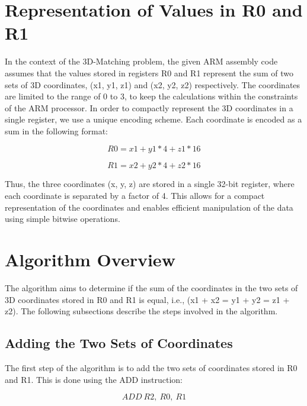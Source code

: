 


\section{Representation of Values in R0 and R1}

In the context of the 3D-Matching problem, the given ARM assembly code assumes that the values stored in registers R0 and R1 represent the sum of two sets of 3D coordinates, (x1, y1, z1) and (x2, y2, z2) respectively. The coordinates are limited to the range of 0 to 3, to keep the calculations within the constraints of the ARM processor. In order to compactly represent the 3D coordinates in a single register, we use a unique encoding scheme. Each coordinate is encoded as a sum in the following format:

\begin{equation}
  R0 = x1 + y1 * 4 + z1 * 16
\end{equation}

\begin{equation}
  R1 = x2 + y2 * 4 + z2 * 16
\end{equation}

Thus, the three coordinates (x, y, z) are stored in a single 32-bit register, where each coordinate is separated by a factor of 4. This allows for a compact representation of the coordinates and enables efficient manipulation of the data using simple bitwise operations.

\section{Algorithm Overview}

The algorithm aims to determine if the sum of the coordinates in the two sets of 3D coordinates stored in R0 and R1 is equal, i.e., (x1 + x2 = y1 + y2 = z1 + z2). The following subsections describe the steps involved in the algorithm.

\subsection{Adding the Two Sets of Coordinates}

The first step of the algorithm is to add the two sets of coordinates stored in R0 and R1. This is done using the ADD instruction:

\begin{equation}
  ADD\ R2,\ R0,\ R1
\end{equation}

